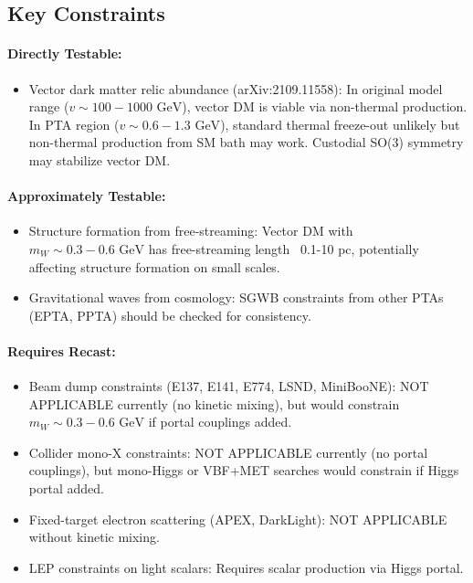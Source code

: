 \documentclass[11pt,a4paper,oneside]{article}
\begin{document}
\subsection{Key Constraints}

\paragraph{Directly Testable:}
\begin{itemize}
\item Vector dark matter relic abundance (arXiv:2109.11558): In original model range ($v \sim 100{-}1000 \text{ GeV}$), vector DM is viable via non-thermal production. In PTA region ($v \sim 0.6{-}1.3 \text{ GeV}$), standard thermal freeze-out unlikely but non-thermal production from SM bath may work. Custodial SO(3) symmetry may stabilize vector DM.
\end{itemize}

\paragraph{Approximately Testable:}
\begin{itemize}
\item Structure formation from free-streaming: Vector DM with $m_W \sim 0.3{-}0.6 \text{ GeV}$ has free-streaming length ~0.1{-}10 pc, potentially affecting structure formation on small scales.
\item Gravitational waves from cosmology: SGWB constraints from other PTAs (EPTA, PPTA) should be checked for consistency.
\end{itemize}

\paragraph{Requires Recast:}
\begin{itemize}
\item Beam dump constraints (E137, E141, E774, LSND, MiniBooNE): NOT APPLICABLE currently (no kinetic mixing), but would constrain $m_W \sim 0.3{-}0.6 \text{ GeV}$ if portal couplings added.
\item Collider mono-X constraints: NOT APPLICABLE currently (no portal couplings), but mono-Higgs or VBF+MET searches would constrain if Higgs portal added.
\item Fixed-target electron scattering (APEX, DarkLight): NOT APPLICABLE without kinetic mixing.
\item LEP constraints on light scalars: Requires scalar production via Higgs portal.
\end{itemize}
\end{document}
